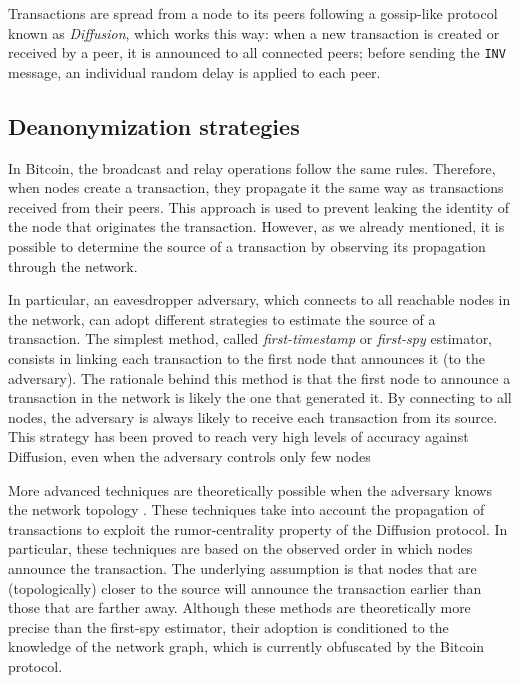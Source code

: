 \documentclass{article}
\begin{document}
	Transactions are spread from a node to its peers following a gossip-like protocol known as \textit{Diffusion}, which works this way: 
	when a new transaction is created or received by a peer, it is announced to all connected peers; 
	before sending the \texttt{INV} message, an individual random delay is applied to each peer.
	
	\subsection{Deanonymization strategies}
	In Bitcoin, the broadcast and relay operations follow the same rules.
	Therefore, when nodes create a transaction, they propagate it the same way as transactions received from their peers.
	This approach is used to prevent leaking the identity of the node that originates the transaction.
	However, as we already mentioned, it is possible to determine the source of a transaction
	by observing its propagation through the network.
	
	In particular, an eavesdropper adversary, which connects to all reachable nodes in the network, can adopt different strategies to estimate the source of a transaction. 
	The simplest method, called \textit{first-timestamp} or \textit{first-spy} estimator, consists in linking each transaction to the first node that announces it (to the adversary).
	The rationale behind this method is that the first node to announce a transaction in the network is likely the one that generated it.
	By connecting to all nodes, the adversary is always likely to receive each transaction from its source.
	This strategy has been proved to reach very high levels of accuracy against Diffusion, even when the adversary controls only few nodes~\cite{fanti2017anonymity}
	
	More advanced techniques are theoretically possible when the adversary knows the network topology \cite{fanti2017anonymity}.
	These techniques take into account the propagation of transactions to exploit the rumor-centrality property of the Diffusion protocol.
	In particular, these techniques are based on the observed order in which nodes announce the transaction.
	The underlying assumption is that nodes that are (topologically) closer to the source will announce the transaction earlier than those that are farther away.
	Although these methods are theoretically more precise than the first-spy estimator, their adoption is conditioned to the knowledge of the network graph, which is currently obfuscated by the Bitcoin protocol.
	
\end{document}
